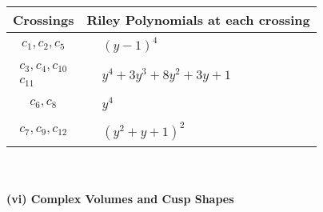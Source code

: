 \documentclass[1p]{elsarticle_modified}
\theoremstyle{definition}
\begin{document}
\begin{tabular}{m{50pt}|m{274pt}}
Crossings & \hspace{64pt}Riley Polynomials at each crossing \\
\hline $$\begin{aligned}c_{1},c_{2},c_{5}\end{aligned}$$&$\begin{aligned}
&(y-1)^4
\end{aligned}$\\
\hline $$\begin{aligned}c_{3},c_{4},c_{10}\\c_{11}\end{aligned}$$&$\begin{aligned}
&y^4+3 y^3+8 y^2+3 y+1
\end{aligned}$\\
\hline $$\begin{aligned}c_{6},c_{8}\end{aligned}$$&$\begin{aligned}
&y^4
\end{aligned}$\\
\hline $$\begin{aligned}c_{7},c_{9},c_{12}\end{aligned}$$&$\begin{aligned}
&(y^2+y+1)^2
\end{aligned}$\\
\hline
\end{tabular}\\~\\
\newpage\flushleft \textbf{(vi) Complex Volumes and Cusp Shapes}
\end{document}
